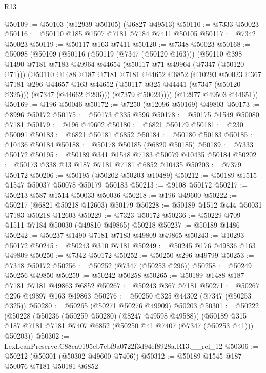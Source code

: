 \begin{lexlean}{R13}
\begin{coremodule}
@50109 := @50103 (@12939 @50105) (@6827 @49513)
@50110 := @7333 @50023
@50116 := @50110 @185 @1507 @7181 @7184 @7411 @50105
@50117 := @7342 @50023
@50119 := @50117 @163 @7411
@50120 := @7348 @50023
@50168 := @50098
    (@50109
      (@50116
        (@50119 (@7347 (@50120 @163)))
        (@50110
          @398
          @1490
          @7181
          @7183
          @49964
          @44654
          (@50117 @71 @49964 (@7347 (@50120 @71)))
          (@50110
            @1488
            @187
            @7181
            @7181
            @44652
            @6852
            (@10293
              @50023
              @367
              @7181
              @296
              @44657
              @163
              @44652
              (@50117 @325 @44441 (@7347 (@50120 @325)))
              (@7347 (@44662 @296)))
            (@7379 @50023))))
      (@12977 @49503 @44651))
@50169 := @196 @50046
@50172 := @7250 (@12096 @50169) @49803
@50173 := @8996 @50172
@50175 := @50173 @335 @596
@50178 := @50175 @1549 @50080 @7181
@50179 := @196 @49602
@50180 := @6821 @50179
@50181 := @230 @50091
@50183 := @6821 @50181 @6852
@50184 := @50180 @50183
@50185 := @10436 @50184
@50188 := @50178 @50185 (@6820 @50185)
@50189 := @7333 @50172
@50195 := @50189 @341 @1548 @7183 @50079 @10435 @50184
@50202 := @50173 @338 @13 @187 @7181 @7181 @6852 @10435
@50203 := @7379 @50172
@50206 := @50195 (@50202 @50203 @10489)
@50212 := @50189 @1515 @1547 @50037 @50078 @50179 @50183
@50213 := @9108 @50172
@50217 := @50213 @587 @1514 @50033 @50036
@50218 := @196 @49600
@50222 := @50217 (@6821 @50218 @12603) @50179
@50228 := @50189 @1512 @444 @50031 @7183 @50218 @12603
@50229 := @7323 @50172
@50236 := @50229 @709 @1511 @7184 @50030 (@49810 @49865) @50218
@50237 := @50189 @1486
@50242 := @50237 @1490 @7181 @7183 @49809 @49865
@50243 := @10293 @50172
@50245 := @50243 @310 @7181
@50249 := @50245 @176 @49836 @163 @49809
@50250 := @7342 @50172
@50252 := @50250 @296 @49799
@50253 := @7348 @50172
@50256 := @50252 (@7347 (@50253 @296))
@50258 := @50249 @50256 @49850
@50259 := @50242 @50258
@50265 := @50189 @1488 @187 @7181 @7181 @49863 @6852
@50267 := @50243 @367 @7181
@50271 := @50267 @296 @49897 @163 @49863
@50276 := @50250 @325 @44302 (@7347 (@50253 @325))
@50280 := @50265 (@50271 @50276 @49909) @50203
@50301 := @50222
    (@50228
      (@50236 (@50259 @50280) (@8247 @49598 @49588))
      (@50189 @315 @187 @7181 @7181 @7407 @6852 (@50250 @41 @7407 (@7347 (@50253 @41))) @50203))
@50302 := LexLeanPreserve.C88ea0195eb7ebf9a0722f3d94ef8928a.R13.__rel_12
@50306 := @50212 (@50301 (@50302 @49600 @7406))
@50312 := @50189 @1545 @187 @50076 @7181 @50181 @6852

\end{coremodule}
\end{lexlean}
